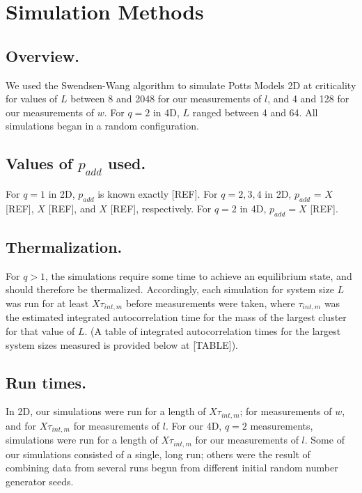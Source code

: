 \documentclass[pre,preprint,11pt]{revtex4}
\begin{document}
\section{Simulation Methods}
\subsection{ Overview.} 

We used the Swendsen-Wang algorithm to simulate Potts Models 2D at criticality for values of $L$ between 8 and 2048 for our  measurements of $l$, and 4 and 128 for our measurements of $w$.  For $q=2$ in 4D, $L$ ranged between 4 and 64.  All simulations began in a random configuration.  


\subsection{ Values of $p_{add}$ used.}  

For $q=1$ in 2D, $p_{add}$ is known exactly [REF].  For $q=2,3,4$ in 2D, $p_{add}$ = $X$ [REF], $X$ [REF], and $X$ [REF], respectively. For $q=2$ in 4D, $p_{add}=X$ [REF].

\subsection{ Thermalization.} 

For $q>1$, the simulations require some time to achieve an equilibrium state, and should therefore be thermalized. Accordingly, each simulation for system size $L$ was run for at least $X \tau_{int,m}$ before measurements were taken, where $\tau_{int,m}$ was the estimated integrated autocorrelation time for the mass of the largest cluster for that value of $L$. (A table of integrated autocorrelation times for the largest system sizes measured is provided below at [TABLE]).  

\subsection{ Run times.} 

In 2D, our simulations were run for a length of $X \tau_{int,m}$; for measurements of $w$, and for $X  \tau_{int,m}$ for measurements of $l$.  For our 4D, $q=2$ measurements, simulations were run for a length of $X \tau_{int,m}$ for our measurements of $l$.  Some of our simulations consisted of a single, long run; others were the result of combining data from several runs begun from different initial random number generator seeds. 
\end{document}
